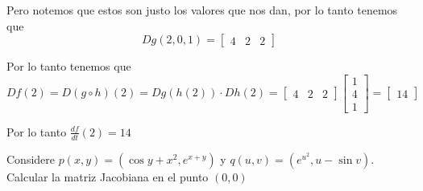 \documentclass[a4paper,oneside,10.5pt]{article}
\begin{document}
\begin{sol}
Pero notemos que estos son justo los valores que nos dan, por lo tanto tenemos que
\begin{equation*}
    Dg(2, 0, 1) = \begin{bmatrix}
        4 & 2 & 2
    \end{bmatrix}
\end{equation*}

Por lo tanto tenemos que
\begin{equation*}
    Df(2) = D(g \circ h)(2) = Dg(h(2)) \cdot Dh(2) = \begin{bmatrix}
        4 & 2 & 2
    \end{bmatrix} \begin{bmatrix}
        1\\ 4\\ 1
    \end{bmatrix} = \begin{bmatrix} 14 \end{bmatrix}
\end{equation*}

Por lo tanto $\frac{df}{dt}(2) = 14$
\end{sol}

\begin{prob}
Considere $p(x, y) = (\cos y + x^2, e^{x + y})$ y $q(u, v) = (e^{u^2}, u - \sin v)$. Calcular la matriz Jacobiana en el punto $(0, 0)$
\end{prob}
\end{document}
